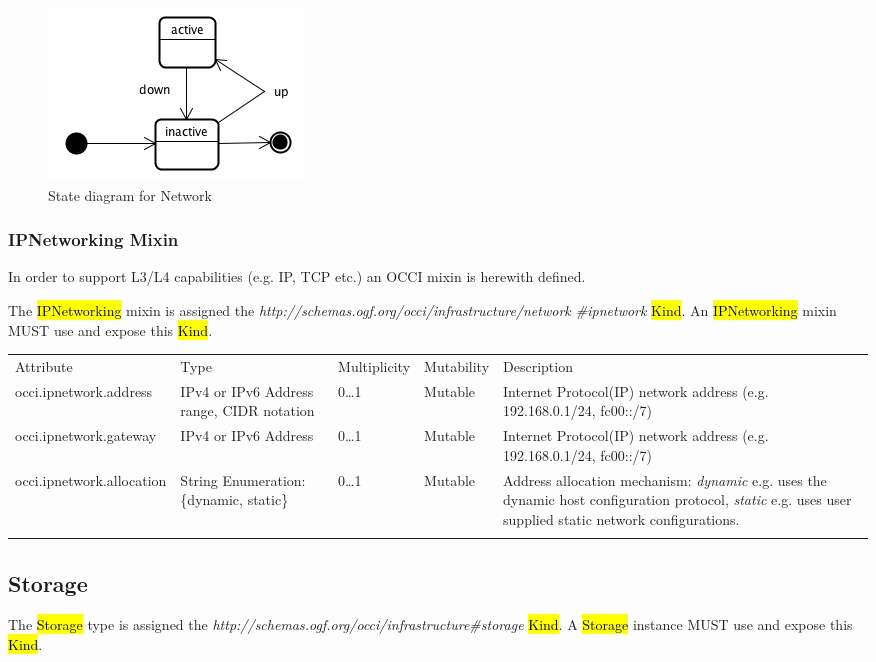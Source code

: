 \documentclass[10pt,a4paper]{article}
\begin{document}
\begin{figure}[!h]
	\centering
	\includegraphics[scale=0.4]{figs/network-state.png}
	\caption{State diagram for Network}
	\label{fig:network_state}
\end{figure}

\subsubsection{IPNetworking Mixin}

In order to support L3/L4 capabilities (e.g. IP, TCP etc.) an OCCI mixin is herewith defined. 

The \hl{IPNetworking} mixin is assigned the \textit{http://schemas.ogf.org/occi/infrastructure/network
\#ipnetwork} \hl{Kind}. An \hl{IPNetworking} mixin MUST use and expose this \hl{Kind}.

\begin{tabular}{lp{2.5cm}p{1cm}lp{6cm}}
\toprule
Attribute&Type&Multi\-plicity&Mutability&Description\\
\colrule
occi.ipnetwork.address & IPv4 or IPv6 Address range, CIDR notation & 0\ldots1 & Mutable & Internet Protocol(IP) network address (e.g. 192.168.0.1/24, fc00::/7)\\
occi.ipnetwork.gateway & IPv4 or IPv6 Address & 0\ldots1 & Mutable & Internet Protocol(IP) network address (e.g. 192.168.0.1/24, fc00::/7)\\
occi.ipnetwork.allocation & String Enumeration: \{dynamic, static\} & 0\ldots1 & Mutable & Address allocation mechanism: \textit{dynamic} e.g. uses the dynamic host configuration protocol, \textit{static} e.g. uses user supplied static network configurations.\\
\botrule
\end{tabular}

\subsection{Storage}
The \hl{Storage} type is assigned the \textit{http://schemas.ogf.org/occi/infrastructure\#storage} \hl{Kind}. A \hl{Storage} instance MUST use and expose this \hl{Kind}.
\end{document}

